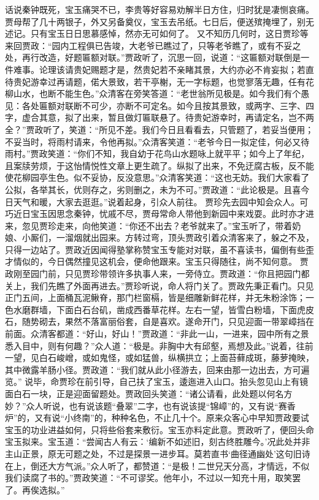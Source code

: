 \documentclass[12pt,oneside]{book}
\begin{document}
话说秦钟既死，宝玉痛哭不已，李贵等好容易劝解半日方住，归时犹是凄恻哀痛。贾母帮了几十两银子，外又另备奠仪，宝玉去吊纸。七日后，便送殡掩埋了，别无述记。只有宝玉日日思慕感悼，然亦无可如何了。
又不知历几何时，这日贾珍等来回贾政：“园内工程俱已告竣，大老爷已瞧过了，只等老爷瞧了，或有不妥之处，再行改造，好题匾额对联。”贾政听了，沉思一回，说道：“这匾额对联倒是一件难事。论理该请贵妃赐题才是，然贵妃若不亲睹其景，大约亦必不肯妄拟；若直待贵妃游幸过再请题，偌大景致，若干亭榭，无一字标题，也觉寥落无趣，任有花柳山水，也断不能生色。”众清客在旁笑答道：“老世翁所见极是。如今我们有个愚见：各处匾额对联断不可少，亦断不可定名。如今且按其景致，或两字、三字、四字，虚合其意，拟了出来，暂且做灯匾联悬了。待贵妃游幸时，再请定名，岂不两全？”贾政听了，笑道：“所见不差。我们今日且看看去，只管题了，若妥当便用；不妥当时，将雨村请来，令他再拟。”众清客笑道：“老爷今日一拟定佳，何必又待雨村。”贾政笑道：“你们不知，我自幼于花鸟山水题咏上就平平；如今上了年纪，且案牍劳烦，于这怡情悦性文章上更生疏了。纵拟了出来，不免迂腐古板，反不能使花柳园亭生色。似不妥协，反没意思。”众清客笑道：“这也无妨。我们大家看了公拟，各举其长，优则存之，劣则删之，未为不可。”贾政道：“此论极是。且喜今日天气和暖，大家去逛逛。”说着起身，引众人前往。
贾珍先去园中知会众人。可巧近日宝玉因思念秦钟，忧戚不尽，贾母常命人带他到新园中来戏耍。此时亦才进来，忽见贾珍走来，向他笑道：“你还不出去？老爷就来了。”宝玉听了，带着奶娘、小厮们，一溜烟就出园来。方转过弯，顶头贾政引着众清客来了，躲之不及，只得一边站了。贾政近因闻得塾掌称赞宝玉专能对对联，虽不喜读书，偏倒有些歪才情似的，今日偶然撞见这机会，便命他跟来。宝玉只得随往，尚不知何意。
贾政刚至园门前，只见贾珍带领许多执事人来，一旁侍立。贾政道：“你且把园门都关上，我们先瞧了外面再进去。”贾珍听说，命人将门关了。贾政先秉正看门。只见正门五间，上面桶瓦泥鳅脊，那门栏窗槅，皆是细雕新鲜花样，并无朱粉涂饰；一色水磨群墙，下面白石台矶，凿成西番草花样。左右一望，皆雪白粉墙，下面虎皮石，随势砌去，果然不落富丽俗套，自是喜欢。遂命开门，只见迎面一带翠嶂挡在前面。众清客都道：“好山，好山！”贾政道：“非此一山，一进来，园中所有之景悉入目中，则有何趣？”众人道：“极是。非胸中大有邱壑，焉想及此。”说着，往前一望，见白石峻嶒，或如鬼怪，或如猛兽，纵横拱立；上面苔藓成斑，藤萝掩映，其中微露羊肠小径。贾政道：“我们就从此小径游去，回来由那一边出去，方可遍览。”
说毕，命贾珍在前引导，自己扶了宝玉，逶迤进入山口。抬头忽见山上有镜面白石一块，正是迎面留题处。贾政回头笑道：“诸公请看，此处题以何名方妙？”众人听说，也有说该题“叠翠”二字，也有说该提“锦嶂”的，又有说“赛香炉”的，又有说“小终南”的，种种名色，不止几十个。原来众客心中早知贾政要试宝玉的功业进益如何，只将些俗套来敷衍。宝玉亦料定此意。贾政听了，便回头命宝玉拟来。宝玉道：“尝闻古人有云：‘编新不如述旧，刻古终胜雕今。’况此处并非主山正景，原无可题之处，不过是探景一进步耳。莫若直书‘曲径通幽处’这句旧诗在上，倒还大方气派。”众人听了，都赞道：“是极！二世兄天分高，才情远，不似我们读腐了书的。”贾政笑道：“不可谬奖。他年小，不过以一知充十用，取笑罢了。再俟选拟。”
\end{document}
